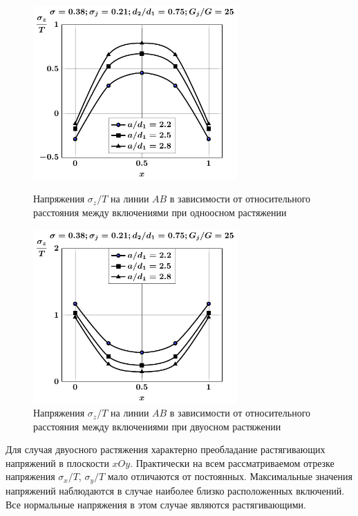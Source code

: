 \begin{figure}[h!]
\centering\footnotesize
\parbox[b]{7.5cm}{\centering\includegraphics[width=7.8cm]{inc4-a-d75-g25-t1-sig_z.pdf}
\caption{Напряжения $\sigma_z/T$ на линии $AB$ в зависимости от относительного расстояния между включениями при одноосном растяжении
\label{f:9:64}}}\hfil\hfil
\parbox[b]{7.5cm}{\centering\includegraphics[width=7.8cm]{inc4-a-d75-g25-t2-sig_z.pdf}
\caption{Напряжения $\sigma_z/T$ на линии $AB$ в зависимости от относительного расстояния между включениями при двуосном растяжении
\label{f:9:65}}}
\end{figure}

Для случая двуосного растяжения характерно преобладание растягивающих напряжений в плоскости $xOy$. Практически на всем рассматриваемом отрезке напряжения $\sigma_x/T$, $\sigma_y/T$ мало отличаются от постоянных. Максимальные значения напряжений наблюдаются в случае наиболее близко расположенных включений. Все нормальные напряжения в этом случае являются растягивающими.

